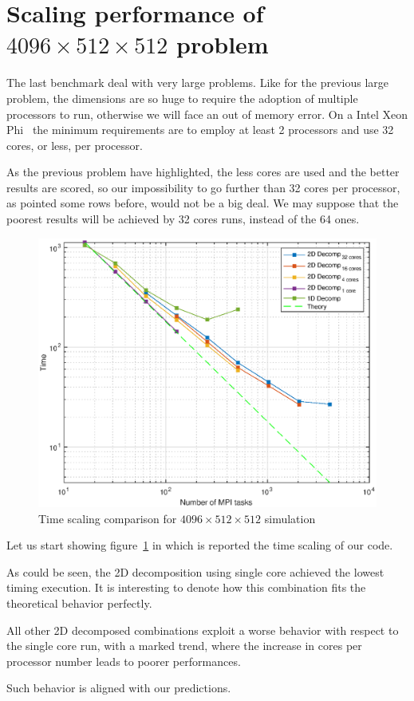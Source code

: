 \section{Scaling performance of $4096\times512\times512$ problem}
The last benchmark deal with very large problems. Like for the previous large problem, the dimensions are so huge to require the adoption of multiple processors to run, otherwise we will face an out of memory error.
On a Intel Xeon Phi~\cite{intel:xeonphi} the minimum requirements are to employ at least 2 processors and use 32 cores, or less, per processor.
\par
As the previous problem have highlighted, the less cores are used and the better results are scored, so our impossibility to go further than 32 cores per processor, as pointed some rows before, would not be a big deal. We may suppose that the poorest results will be achieved by 32 cores runs, instead of the 64 ones. \\
\par

\begin{figure}
\begin{center}
\includegraphics[scale=0.55]{grafici/20481}
\caption{Time scaling comparison for $4096\times 512\times 512$ simulation}
\label{20481}
\end{center} 
\end{figure}

Let us start showing figure~\ref{20481} in which is reported the time scaling of our code.\par
As could be seen, the 2D decomposition using single core achieved the lowest timing execution.
It is interesting to denote how this combination fits the theoretical behavior perfectly.\par
All other 2D decomposed combinations exploit a worse behavior with respect to the single core run, with a marked trend, where the increase in cores per processor number leads to poorer performances. \par 
Such behavior is aligned with our predictions.\\

